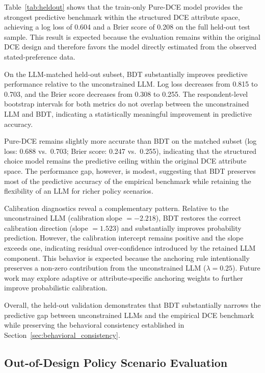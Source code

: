 \documentclass[11pt]{article}
\begin{document}
Table~\ref{tab:heldout} shows that the train-only Pure-DCE model provides the strongest predictive benchmark within the structured DCE attribute space, achieving a log loss of 0.604 and a Brier score of 0.208 on the full held-out test sample. This result is expected because the evaluation remains within the original DCE design and therefore favors the model directly estimated from the observed stated-preference data.

On the LLM-matched held-out subset, BDT substantially improves predictive performance relative to the unconstrained LLM. Log loss decreases from 0.815 to 0.703, and the Brier score decreases from 0.308 to 0.255. The respondent-level bootstrap intervals for both metrics do not overlap between the unconstrained LLM and BDT, indicating a statistically meaningful improvement in predictive accuracy.

Pure-DCE remains slightly more accurate than BDT on the matched subset (log loss: 0.688 vs.\ 0.703; Brier score: 0.247 vs.\ 0.255), indicating that the structured choice model remains the predictive ceiling within the original DCE attribute space. The performance gap, however, is modest, suggesting that BDT preserves most of the predictive accuracy of the empirical benchmark while retaining the flexibility of an LLM for richer policy scenarios.

Calibration diagnostics reveal a complementary pattern. Relative to the unconstrained LLM (calibration slope $=-2.218$), BDT restores the correct calibration direction (slope $=1.523$) and substantially improves probability prediction. However, the calibration intercept remains positive and the slope exceeds one, indicating residual over-confidence introduced by the retained LLM component. This behavior is expected because the anchoring rule intentionally preserves a non-zero contribution from the unconstrained LLM ($\lambda=0.25$). Future work may explore adaptive or attribute-specific anchoring weights to further improve probabilistic calibration.

Overall, the held-out validation demonstrates that BDT substantially narrows the predictive gap between unconstrained LLMs and the empirical DCE benchmark while preserving the behavioral consistency established in Section~\ref{sec:behavioral_consistency}.

\clearpage

\clearpage
\subsection{Out-of-Design Policy Scenario Evaluation}
\label{sec:out_of_design}
\end{document}
